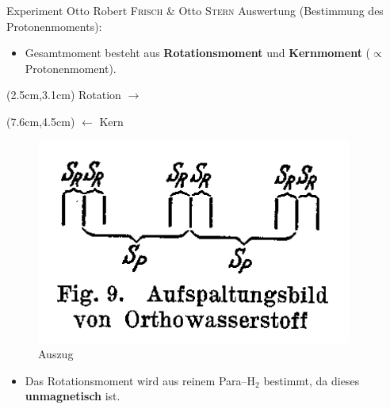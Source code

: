 \documentclass[t,9pt]{beamer}
\begin{document}
        \begin{frame}{Experiment Otto Robert \textsc{Frisch} \& Otto \textsc{Stern}}
                Auswertung (Bestimmung des Protonenmoments):        
                \begin{itemize}
                        \item Gesamtmoment besteht aus \textbf{Rotationsmoment} und \textbf{Kernmoment} ($\propto$ Protonenmoment).
                \end{itemize}
                \begin{textblock*}{100pt}(2.5cm,3.1cm)
                        Rotation $\rightarrow $ 
                \end{textblock*}
                \begin{textblock*}{100pt}(7.6cm,4.5cm)
                        $\leftarrow $ Kern
                \end{textblock*}
                \begin{figure}
                        \centering
                        \includegraphics[width=.4\textwidth]{prosi_aufspaltungsbild_orthowasserstoff.png}
                        \caption*{Auszug \cite{FrischStern1933}}
                \end{figure}
                \begin{itemize}
                        \item Das Rotationsmoment wird aus reinem Para--$\text{H}_2$ bestimmt, da dieses \textbf{unmagnetisch} ist. 
                \end{itemize}
        \end{frame}
\end{document}
